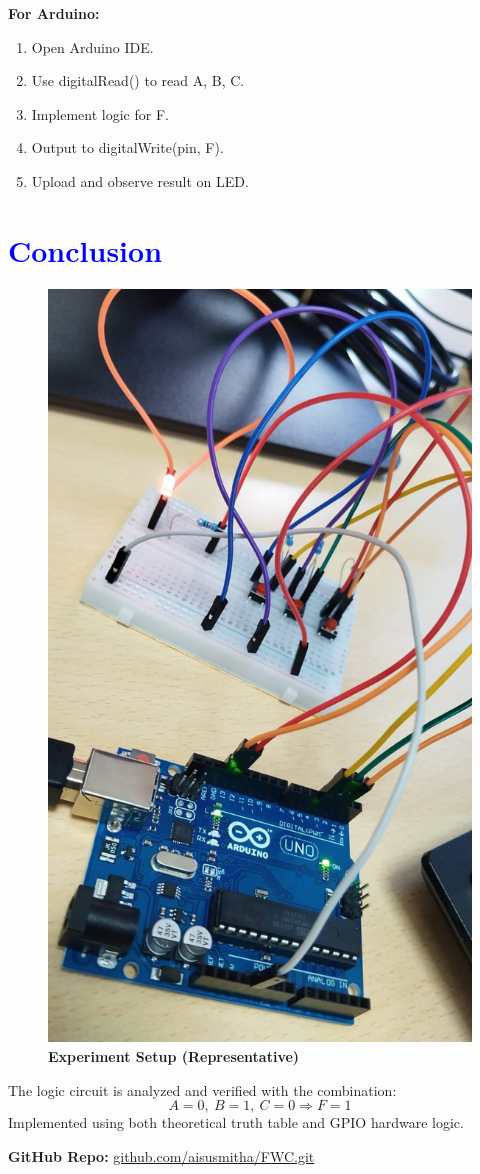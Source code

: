 \documentclass[twocolumn]{article}
\begin{document}
\textbf{For Arduino:}
\begin{enumerate}
    \item Open Arduino IDE.
    \item Use digitalRead() to read A, B, C.
    \item Implement logic for F.
    \item Output to digitalWrite(pin, F).
    \item Upload and observe result on LED.
\end{enumerate}

\section*{\textcolor{blue}{Conclusion}}

\begin{figure}[h]
    \centering
    \includegraphics[width=\linewidth]{fpga.jpeg}
        \caption*{\textbf{Experiment Setup (Representative)}}
\end{figure}

The logic circuit is analyzed and verified with the combination:
\[
\boxed{A=0,\ B=1,\ C=0 \Rightarrow F=1}
\]
Implemented using both theoretical truth table and GPIO hardware logic.

\textbf{GitHub Repo:} \href{https://github.com/aisusmitha/FWC.git}{github.com/aisusmitha/FWC.git}
\end{document}
